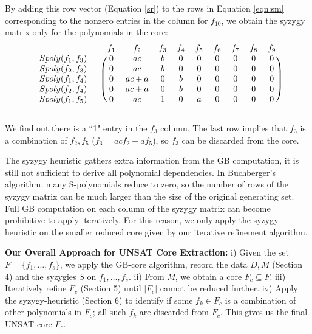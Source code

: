 \begin{Example}
 By adding this row vector (Equation \ref{sr}) to the rows in
 Equation \ref{eqn:sm} corresponding to the nonzero entries in the
 column for $f_{10}$, we obtain the syzygy matrix only for the
 polynomials in the core:
  \[
 \begin{blockarray}{ccccccccccc}
  && f_1 & f_2 & f_3 & f_4 & f_5 & f_6 & f_7 & f_8 & f_9  \\
  \begin{block}{cc(ccccccccc)}
  Spoly(f_1,f_3)\ & & 0 & ac & b &0&0&0&0&0&0\\
  Spoly(f_2,f_3)\  && 0 & ac & b &0&0&0&0&0&0\\
  Spoly(f_1,f_4)\  && 0 & ac+a & 0 &b&0&0&0&0&0\\
  Spoly(f_2,f_4)\  && 0 & ac+a & 0 &b&0&0&0&0&0\\
  Spoly(f_1,f_5)\  && 0 & ac & 1 &0&a&0&0&0&0\\
  \end{block}
  \end{blockarray}
 \]

 We find out there is a ``1" entry in the $f_3$ column. The last row
 implies that $f_3$ is a combination of $f_2, f_5$ ($f_3 = ac f_2 + a
 f_5$), so $f_3$ can be discarded from the core. 

 \end{Example}

The syzygy heuristic gathers extra information from the GB
computation, it is still not sufficient to derive all polynomial
dependencies. In Buchberger's algorithm,  many S-polynomials reduce to
zero, so the number of rows of the syzygy matrix can be much larger than
the size of the original generating set. Full GB computation on each
column of the syzygy matrix can become prohibitive to apply
iteratively. For this reason, we only apply the syzygy heuristic
on the smaller reduced core given by our iterative refinement algorithm.

\textbf{Our Overall Approach for UNSAT Core Extraction:} i) Given
the set $F = \{f_1,\dots,f_s\}$, we apply the GB-core algorithm,
record the data $D, M$ (Section 4) and the syzygies $S$ on
$f_1,\dots,f_s$. ii) From $M$, we obtain a core $F_c \subseteq
F$. iii) Iteratively refine $F_c$ (Section 5) until $|F_c|$ cannot be
reduced further. iv) Apply the syzygy-heuristic (Section 6) to
identify if some $f_k \in F_c$ is a combination of other polynomials
in $F_c$; all such $f_k$ are discarded from $F_c$. This gives us the
final UNSAT core $F_c$. 

